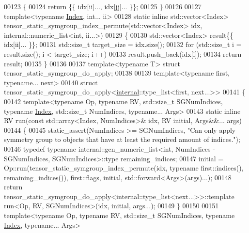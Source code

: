 \begin{DoxyCode}
00123 \{
00124   \textcolor{keywordflow}{return} \{\{ idx[ii]..., idx[jj]... \}\};
00125 \}
00126 
00127 \textcolor{keyword}{template}<\textcolor{keyword}{typename} \hyperlink{namespace_eigen_a62e77e0933482dafde8fe197d9a2cfde}{Index}, \textcolor{keywordtype}{int}... ii>
00128 \textcolor{keyword}{static} \textcolor{keyword}{inline} std::vector<Index> tensor\_static\_symgroup\_index\_permute(std::vector<Index> idx, 
      internal::numeric\_list<int, ii...>)
00129 \{
00130   std::vector<Index> result\{\{ idx[ii]... \}\};
00131   std::size\_t target\_size = idx.size();
00132   \textcolor{keywordflow}{for} (std::size\_t i = result.size(); i < target\_size; i++)
00133     result.push\_back(idx[i]);
00134   \textcolor{keywordflow}{return} result;
00135 \}
00136 
00137 \textcolor{keyword}{template}<\textcolor{keyword}{typename} T> \textcolor{keyword}{struct }tensor\_static\_symgroup\_do\_apply;
00138 
00139 \textcolor{keyword}{template}<\textcolor{keyword}{typename} first, \textcolor{keyword}{typename}... next>
00140 \textcolor{keyword}{struct }tensor\_static\_symgroup\_do\_apply<\hyperlink{namespaceinternal}{internal}::type\_list<first, next...>>
00141 \{
00142   \textcolor{keyword}{template}<\textcolor{keyword}{typename} Op, \textcolor{keyword}{typename} RV, std::size\_t SGNumIndices, \textcolor{keyword}{typename} \hyperlink{namespace_eigen_a62e77e0933482dafde8fe197d9a2cfde}{Index}, std::size\_t NumIndices,
       \textcolor{keyword}{typename}... Args>
00143   \textcolor{keyword}{static} \textcolor{keyword}{inline} RV run(\textcolor{keyword}{const} std::array<Index, NumIndices>& idx, RV initial, Args&&... args)
00144   \{
00145     static\_assert(NumIndices >= SGNumIndices, \textcolor{stringliteral}{"Can only apply symmetry group to objects that have at least
       the required amount of indices."});
00146     \textcolor{keyword}{typedef} \textcolor{keyword}{typename} internal::gen\_numeric\_list<int, NumIndices - SGNumIndices, SGNumIndices>::type 
      remaining\_indices;
00147     initial = Op::run(tensor\_static\_symgroup\_index\_permute(idx, \textcolor{keyword}{typename} first::indices(), 
      remaining\_indices()), first::flags, initial, std::forward<Args>(args)...);
00148     \textcolor{keywordflow}{return} tensor\_static\_symgroup\_do\_apply<internal::type\_list<next...>>::template run<Op, RV,
       SGNumIndices>(idx, initial, args...);
00149   \}
00150 
00151   \textcolor{keyword}{template}<\textcolor{keyword}{typename} Op, \textcolor{keyword}{typename} RV, std::size\_t SGNumIndices, \textcolor{keyword}{typename} \hyperlink{namespace_eigen_a62e77e0933482dafde8fe197d9a2cfde}{Index}, \textcolor{keyword}{typename}... Args>

\end{DoxyCode}
